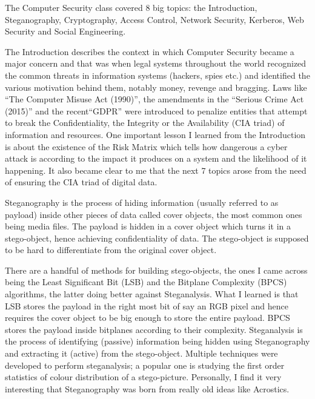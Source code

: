 \documentclass[a4paper]{article}
\begin{document}
The Computer Security class covered 8 big topics:
the Introduction,
Steganography,
Cryptography,
Access Control,
Network Security,
Kerberos,
Web Security and
Social Engineering.

The Introduction describes the context in which Computer Security became
a major concern and that was when legal systems throughout the world
recognized the common threats in information systems (hackers, spies etc.)
and identified the various motivation behind them, notably money, revenge
and bragging. Laws like ``The Computer Misuse Act (1990)'', the amendments
in the ``Serious Crime Act (2015)'' and the recent``GDPR'' were introduced
to penalize entities that attempt to break the
Confidentiality, the Integrity or the Availability (CIA triad) of information
and resources. One important lesson I learned from the Introduction is
about the existence of the Risk Matrix which tells how dangerous
a cyber attack is
according to the impact it produces on a system and the likelihood of
it happening. It also became clear to me that the next 7 topics arose
from the need of ensuring
the CIA triad of digital data.

Steganography is the process of hiding information (usually referred to as
payload) inside other pieces of data
called cover objects, the most common ones being media files. The payload
is hidden in a cover object which turns it in a stego-object, hence achieving
confidentiality of data. The stego-object is supposed to be hard to
differentiate from the original cover object.

There are a handful of methods for building stego-objects, the ones I came
across being the Least Significant Bit (LSB) and the Bitplane
Complexity (BPCS) algorithms, the latter doing better against Steganalysis.
What I learned is that LSB stores the payload in the right most bit of say
an RGB pixel and hence requires the cover object to be big enough to store the
entire payload. BPCS stores the payload inside bitplanes according to their
complexity. Steganalysis is the process of identifying (passive) information
being hidden using Steganography and extracting it (active) from the
stego-object. Multiple techniques were developed to perform steganalysis; a
popular one is studying the first order statistics of colour distribution
of a stego-picture. Personally, I find it very interesting that Steganography
was born from really old ideas like Acrostics.
\end{document}
